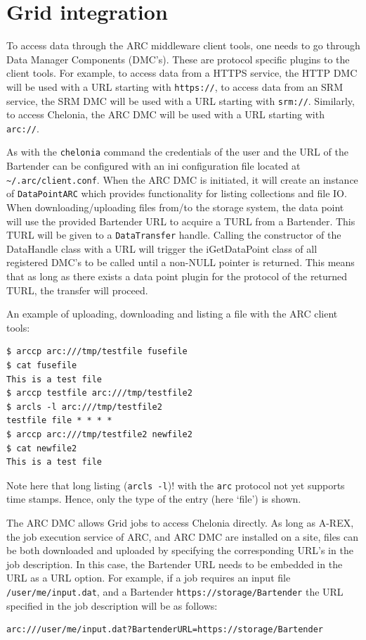 \documentclass{book}
\begin{document}

\section{Grid integration} %
\label{sec:grid_integration}

To access data through the ARC middleware client tools, one needs to go through Data Manager Components (DMC's). These are protocol specific plugins to the client tools. For example, to access data from a HTTPS service, the HTTP DMC will be used with a URL starting with \verb!https://!, to access data from an SRM service, the SRM DMC will be used with a URL starting with \verb!srm://!. Similarly, to access Chelonia, the ARC DMC will be used with a URL starting with \verb!arc://!. 

As with the \verb!chelonia! command the credentials of the user and
the URL of the Bartender can be configured with an ini configuration file located at \verb!~/.arc/client.conf!. When the ARC DMC is initiated, it will create an instance of \verb!DataPointARC! which provides functionality for listing collections and file IO. When downloading/uploading files from/to the storage system, the data point will use the provided Bartender URL to acquire a TURL from a Bartender. This TURL will be given to a \verb!DataTransfer! handle. Calling the constructor of the DataHandle class with a URL will trigger the iGetDataPoint class of all registered DMC's to be called until a non-NULL pointer is returned. This means that as long as there exists a data point plugin for the protocol of the returned TURL, the transfer will proceed.

An example of uploading, downloading and listing a file with the ARC client tools:

\begin{verbatim}
$ arccp arc:///tmp/testfile fusefile
$ cat fusefile
This is a test file
$ arccp testfile arc:///tmp/testfile2
$ arcls -l arc:///tmp/testfile2
testfile file * * * *
$ arccp arc:///tmp/testfile2 newfile2
$ cat newfile2
This is a test file
\end{verbatim}

Note here that long listing (\verb!arcls -l!)! with the \verb!arc! protocol not yet supports time stamps. Hence, only the type of the entry (here `file') is shown.

The ARC DMC allows Grid jobs to access Chelonia directly. As long as A-REX, the job execution service of ARC, and ARC DMC are installed on a site, files can be both downloaded and uploaded by specifying the corresponding URL's in the job description. In this case, the Bartender URL needs to be embedded in the URL as a URL option. For example, if a job requires an input file \verb!/user/me/input.dat!, and a Bartender \verb!https://storage/Bartender! the URL specified in the job description will be as follows:
\begin{verbatim}
arc:///user/me/input.dat?BartenderURL=https://storage/Bartender
\end{verbatim}


% 
\end{document}
